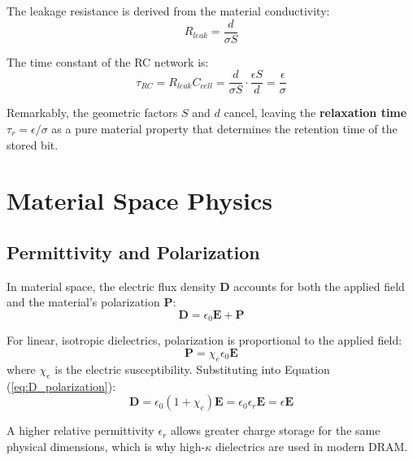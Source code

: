 \documentclass[12pt,a4paper]{report}
\begin{document}
The leakage resistance is derived from the material conductivity:
\begin{equation}
    R_{leak} = \frac{d}{\sigma S}
    \label{eq:R_leak}
\end{equation}

The time constant of the RC network is:
\begin{equation}
    \tau_{RC} = R_{leak} C_{cell} = \frac{d}{\sigma S} \cdot \frac{\epsilon S}{d} = \frac{\epsilon}{\sigma}
    \label{eq:tau_RC}
\end{equation}

Remarkably, the geometric factors $S$ and $d$ cancel, leaving the \textbf{relaxation time} $\tau_r = \epsilon/\sigma$ as a pure material property that determines the retention time of the stored bit.

\chapter{Material Space Physics}
\label{ch:materials}

\section{Permittivity and Polarization}

In material space, the electric flux density $\mathbf{D}$ accounts for both the applied field and the material's polarization $\mathbf{P}$:
\begin{equation}
    \mathbf{D} = \epsilon_0 \mathbf{E} + \mathbf{P}
    \label{eq:D_polarization}
\end{equation}

For linear, isotropic dielectrics, polarization is proportional to the applied field:
\begin{equation}
    \mathbf{P} = \chi_e \epsilon_0 \mathbf{E}
    \label{eq:P}
\end{equation}
where $\chi_e$ is the electric susceptibility. Substituting into Equation (\ref{eq:D_polarization}):
\begin{equation}
    \mathbf{D} = \epsilon_0(1 + \chi_e)\mathbf{E} = \epsilon_0 \epsilon_r \mathbf{E} = \epsilon \mathbf{E}
    \label{eq:D_final}
\end{equation}

A higher relative permittivity $\epsilon_r$ allows greater charge storage for the same physical dimensions, which is why high-$\kappa$ dielectrics are used in modern DRAM.
\end{document}
